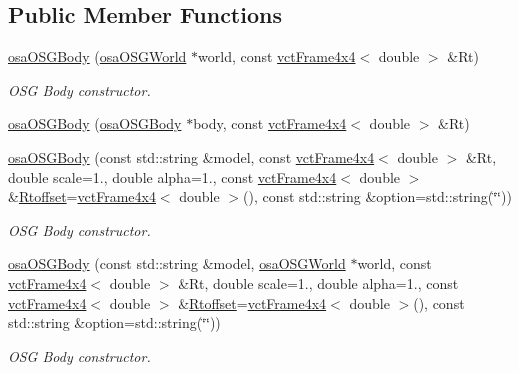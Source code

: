 \subsection*{Public Member Functions}
\begin{DoxyCompactItemize}
\item 
\hyperlink{classosa_o_s_g_body_a97c219501ee9a54f2ef495751a99254f}{osa\+O\+S\+G\+Body} (\hyperlink{classosa_o_s_g_world}{osa\+O\+S\+G\+World} $\ast$world, const \hyperlink{classvct_frame4x4}{vct\+Frame4x4}$<$ double $>$ \&Rt)
\begin{DoxyCompactList}\small\item\em O\+S\+G Body constructor. \end{DoxyCompactList}\item 
\hyperlink{classosa_o_s_g_body_a2ebb0bce287bdb02354eb1e44277073e}{osa\+O\+S\+G\+Body} (\hyperlink{classosa_o_s_g_body}{osa\+O\+S\+G\+Body} $\ast$body, const \hyperlink{classvct_frame4x4}{vct\+Frame4x4}$<$ double $>$ \&Rt)
\item 
\hyperlink{classosa_o_s_g_body_aec19a12554af6c42afb903ed1bd5a171}{osa\+O\+S\+G\+Body} (const std\+::string \&model, const \hyperlink{classvct_frame4x4}{vct\+Frame4x4}$<$ double $>$ \&Rt, double scale=1., double alpha=1., const \hyperlink{classvct_frame4x4}{vct\+Frame4x4}$<$ double $>$ \&\hyperlink{classosa_o_s_g_body_ad008984bdb0eda300948932eda13974a}{Rtoffset}=\hyperlink{classvct_frame4x4}{vct\+Frame4x4}$<$ double $>$(), const std\+::string \&option=std\+::string(\char`\"{}\char`\"{}))
\begin{DoxyCompactList}\small\item\em O\+S\+G Body constructor. \end{DoxyCompactList}\item 
\hyperlink{classosa_o_s_g_body_a358379da09846c1782ef1be224e8f828}{osa\+O\+S\+G\+Body} (const std\+::string \&model, \hyperlink{classosa_o_s_g_world}{osa\+O\+S\+G\+World} $\ast$world, const \hyperlink{classvct_frame4x4}{vct\+Frame4x4}$<$ double $>$ \&Rt, double scale=1., double alpha=1., const \hyperlink{classvct_frame4x4}{vct\+Frame4x4}$<$ double $>$ \&\hyperlink{classosa_o_s_g_body_ad008984bdb0eda300948932eda13974a}{Rtoffset}=\hyperlink{classvct_frame4x4}{vct\+Frame4x4}$<$ double $>$(), const std\+::string \&option=std\+::string(\char`\"{}\char`\"{}))
\begin{DoxyCompactList}\small\item\em O\+S\+G Body constructor. \end{DoxyCompactList}\item 

\end{DoxyCompactItemize}
